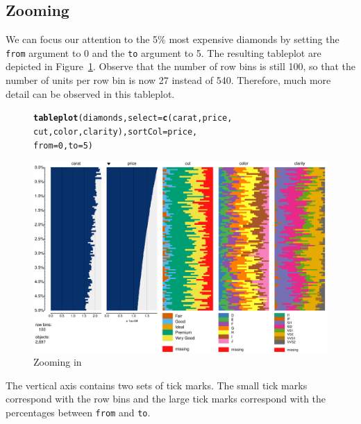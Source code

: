 \documentclass[11pt, fleqn, a4paper]{article}\usepackage[]{graphicx}\usepackage[]{color}
\makeatletter
\def\maxwidth{ %
  \ifdim\Gin@nat@width>\linewidth
    \linewidth
  \else
    \Gin@nat@width
  \fi
}
\newcommand{\hlnum}[1]{\textcolor[rgb]{0.686,0.059,0.569}{#1}}%
\newcommand{\hlstd}[1]{\textcolor[rgb]{0.345,0.345,0.345}{#1}}%
\newcommand{\hlkwc}[1]{\textcolor[rgb]{0.333,0.667,0.333}{#1}}%
\newcommand{\hlkwd}[1]{\textcolor[rgb]{0.737,0.353,0.396}{\textbf{#1}}}%
\newenvironment{kframe}{%
 \def\at@end@of@kframe{}%
 \ifinner\ifhmode%
  \def\at@end@of@kframe{\end{minipage}}%
  \begin{minipage}{\columnwidth}%
 \fi\fi%
 \def\FrameCommand##1{\hskip\@totalleftmargin \hskip-\fboxsep
 \colorbox{shadecolor}{##1}\hskip-\fboxsep
     \hskip-\linewidth \hskip-\@totalleftmargin \hskip\columnwidth}%
 \MakeFramed {\advance\hsize-\width
   \@totalleftmargin\z@ \linewidth\hsize
   \@setminipage}}%
 {\par\unskip\endMakeFramed%
 \at@end@of@kframe}
\newenvironment{knitrout}{}{} %
\makeatother
\begin{document}
\subsection{Zooming}
We can focus our attention to the 5\% most expensive diamonds by setting the {\tt from} argument to 0 and the {\tt to} argument to 5. The resulting tableplot are depicted in Figure~\ref{fig:tp3}. Observe that the number of row bins is still 100, so that the number of units per row bin is now 27 instead of 540. Therefore, much more detail can be observed in this tableplot.


\begin{figure}[!htp]
\begin{knitrout}
\color{fgcolor}\begin{kframe}
\begin{alltt}
\hlkwd{tableplot}\hlstd{(diamonds,} \hlkwc{select} \hlstd{=} \hlkwd{c}\hlstd{(carat, price,}
    \hlstd{cut, color, clarity),} \hlkwc{sortCol} \hlstd{= price,}
    \hlkwc{from} \hlstd{=} \hlnum{0}\hlstd{,} \hlkwc{to} \hlstd{=} \hlnum{5}\hlstd{)}
\end{alltt}
\end{kframe}
\includegraphics[width=\maxwidth]{figure/chunk4} 

\end{knitrout}

\caption{Zooming in}
\label{fig:tp3}
\end{figure}

The vertical axis contains two sets of tick marks. The small tick marks correspond with the row bins and the large tick marks correspond with the percentages between {\tt from} and {\tt to}.
\end{document}
